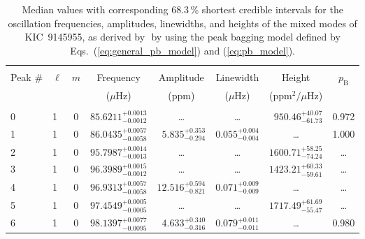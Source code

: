 \begin{table*}[!]
\caption{Median values with corresponding 68.3\,\% shortest credible intervals for the oscillation frequencies, amplitudes, linewidths, and heights of the mixed modes of KIC~9145955, as derived by \diamonds\,\,by using the peak bagging model defined by Eqs.~(\ref{eq:general_pb_model}) and (\ref{eq:pb_model}).}
\label{tab:9145955m}
\centering
\begin{tabular}{llcrrlrc}
\hline\hline
\\[-8pt]      
Peak \# & $\ell$ & $m$ & \multicolumn{1}{c}{Frequency} & \multicolumn{1}{c}{Amplitude} & \multicolumn{1}{c}{Linewidth} & \multicolumn{1}{c}{Height}& $p_\mathrm{B}$\\
 & & & \multicolumn{1}{c}{($\mu$Hz)} & \multicolumn{1}{c}{(ppm)} & \multicolumn{1}{c}{($\mu$Hz)} & \multicolumn{1}{c}{(ppm$^2/\mu$Hz)}\\
\hline \\[-8pt]
0 & 1 & 0 & $     85.6211_{-      0.0012}^{+      0.0013}$ & \multicolumn{1}{c}{\dots} & \multicolumn{1}{c}{\dots} & $      950.46_{-       61.73}^{+       40.07}$ & 0.972\\[1pt]
1 & 1 & 0 & $     86.0435_{-      0.0058}^{+      0.0057}$ & $       5.835_{-       0.294}^{+       0.353}$ & $       0.055_{-       0.004}^{+       0.004}$ & \multicolumn{1}{c}{\dots} & 1.000\\[1pt]

2 & 1 & 0 & $     95.7987_{-      0.0013}^{+      0.0014}$ & \multicolumn{1}{c}{\dots} & \multicolumn{1}{c}{\dots} & $     1600.71_{-       74.24}^{+       58.25}$ & \dots \\[1pt]
3 & 1 & 0 & $     96.3989_{-      0.0012}^{+      0.0015}$ & \multicolumn{1}{c}{\dots} & \multicolumn{1}{c}{\dots} & $     1423.21_{-       59.61}^{+       60.33}$ & \dots \\[1pt]
4 & 1 & 0 & $     96.9313_{-      0.0058}^{+      0.0057}$ & $      12.516_{-       0.821}^{+       0.594}$ & $       0.071_{-       0.009}^{+       0.009}$ & \multicolumn{1}{c}{\dots} & \dots \\[1pt]
5 & 1 & 0 & $     97.4549_{-      0.0005}^{+      0.0005}$ & \multicolumn{1}{c}{\dots} & \multicolumn{1}{c}{\dots} & $     1717.49_{-       55.47}^{+       61.69}$ & \dots \\[1pt]
6 & 1 & 0 & $     98.1397_{-      0.0095}^{+      0.0077}$ & $       4.633_{-       0.316}^{+       0.340}$ & $       0.079_{-       0.011}^{+       0.011}$ & \multicolumn{1}{c}{\dots} & 0.980\\[1pt]


\end{tabular}
\end{table*}
